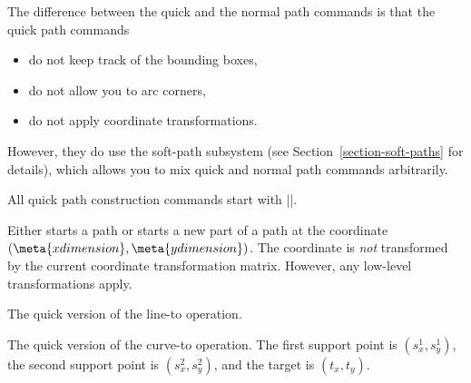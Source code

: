 The difference between the quick and the normal path commands is that the quick
path commands
%
\begin{itemize}
    \item do not keep track of the bounding boxes,
    \item do not allow you to arc corners,
    \item do not apply coordinate transformations.
\end{itemize}

However, they do use the soft-path subsystem (see
Section~\ref{section-soft-paths} for details), which allows you to mix quick
and normal path commands arbitrarily.

All quick path construction commands start with |\pgfpathq|.

\begin{command}{\pgfpathqmoveto{}}
    Either starts a path or starts a new part of a path at the coordinate
    $(\meta{x dimension},\meta{y dimension})$. The coordinate is \emph{not}
    transformed by the current coordinate transformation matrix. However, any
    low-level transformations apply.
\begin{codeexample}[]
\end{codeexample}
\end{command}

\begin{command}{\pgfpathqlineto{}}
    The quick version of the line-to operation.
\end{command}

\begin{command}{\pgfpathqcurveto{}}
    The quick version of the curve-to operation. The first support point is
    $(s^1_x,s^1_y)$, the second support point is $(s^2_x,s^2_y)$, and the
    target is $(t_x,t_y)$.
\begin{codeexample}[]
\end{codeexample}
\end{command}

